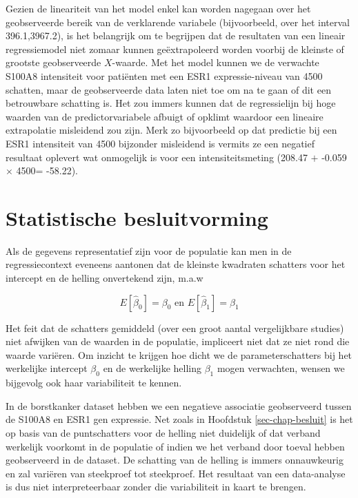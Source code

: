 \documentclass[
  dutch,
  letterpaper,
  12pt]{book}
\theoremstyle{definition}
\theoremstyle{definition}
\theoremstyle{definition}
\theoremstyle{remark}
\begin{document}
Gezien de lineariteit van het model enkel kan worden nagegaan over het
geobserveerde bereik van de verklarende variabele (bijvoorbeeld, over
het interval 396.1,3967.2), is het belangrijk om te begrijpen dat de
resultaten van een lineair regressiemodel niet zomaar kunnen
geëxtrapoleerd worden voorbij de kleinste of grootste geobserveerde
\(X\)-waarde. Met het model kunnen we de verwachte S100A8 intensiteit
voor patiënten met een ESR1 expressie-niveau van 4500 schatten, maar de
geobserveerde data laten niet toe om na te gaan of dit een betrouwbare
schatting is. Het zou immers kunnen dat de regressielijn bij hoge
waarden van de predictorvariabele afbuigt of opklimt waardoor een
lineaire extrapolatie misleidend zou zijn. Merk zo bijvoorbeeld op dat
predictie bij een ESR1 intensiteit van 4500 bijzonder misleidend is
vermits ze een negatief resultaat oplevert wat onmogelijk is voor een
intensiteitsmeting (208.47 \(+\) -0.059 \(\times\) 4500= -58.22).

\section{Statistische besluitvorming}\label{sec-linBesluit}

Als de gegevens representatief zijn voor de populatie kan men in de
regressiecontext eveneens aantonen dat de kleinste kwadraten schatters
voor het intercept en de helling onvertekend zijn, m.a.w

\[E[\hat \beta_0]=\beta_0 \text{ en } E[\hat \beta_1]=\beta_1\]

Het feit dat de schatters gemiddeld (over een groot aantal vergelijkbare
studies) niet afwijken van de waarden in de populatie, impliceert niet
dat ze niet rond die waarde variëren. Om inzicht te krijgen hoe dicht we
de parameterschatters bij het werkelijke intercept \(\beta_0\) en de
werkelijke helling \(\beta_1\) mogen verwachten, wensen we bijgevolg ook
haar variabiliteit te kennen.

In de borstkanker dataset hebben we een negatieve associatie
geobserveerd tussen de S100A8 en ESR1 gen expressie. Net zoals in
Hoofdstuk \ref{sec-chap-besluit} is het op basis van de puntschatters
voor de helling niet duidelijk of dat verband werkelijk voorkomt in de
populatie of indien we het verband door toeval hebben geobserveerd in de
dataset. De schatting van de helling is immers onnauwkeurig en zal
variëren van steekproef tot steekproef. Het resultaat van een
data-analyse is dus niet interpreteerbaar zonder die variabiliteit in
kaart te brengen.
\end{document}
